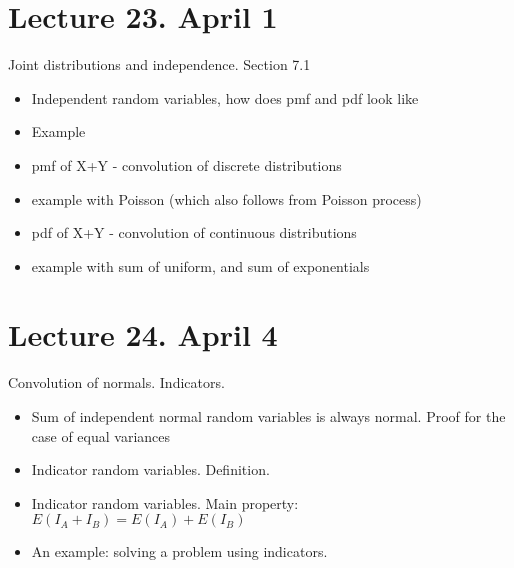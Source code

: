 \documentclass[letterpaper,11pt,oneside,reqno]{amsart}
\numberwithin{equation}{section}
\theoremstyle{definition}
\begin{document}
\section*{Lecture 23. April 1}

Joint distributions and independence. Section 7.1
\begin{itemize}
\item Independent random variables, how does pmf and pdf look like
\item Example
\item pmf of X+Y - convolution of discrete distributions
\item example with Poisson (which also follows from Poisson process)
\item pdf of X+Y - convolution of continuous distributions
\item example with sum of uniform, and sum of exponentials
\end{itemize}

\section*{Lecture 24. April 4}

Convolution of normals. Indicators.
\begin{itemize}
	\item Sum of independent normal random variables
		is always normal. Proof for the case of equal variances
	\item Indicator random variables. Definition.
	\item Indicator random variables. Main property:
		$E(I_A+I_B)=E(I_A)+E(I_B)$
	\item An example: solving a problem using indicators.
\end{itemize}
\end{document}
